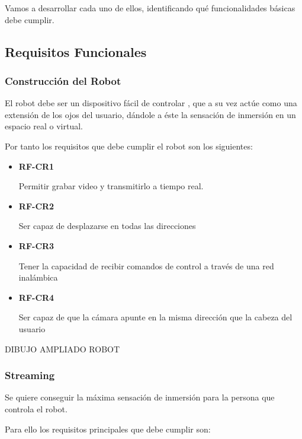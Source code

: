 \documentclass[twoside, 12pt]{epstfg}
\begin{document}
Vamos a desarrollar cada uno de ellos, identificando qué funcionalidades básicas debe cumplir.

\subsection{Requisitos Funcionales}

\subsubsection{Construcción del Robot}


El robot debe ser un dispositivo fácil de controlar , que a su vez actúe como una extensión de los ojos del usuario, dándole a éste la sensación de inmersión en un espacio real o virtual.

Por tanto los requisitos que debe cumplir el robot son los siguientes:


\begin{itemize}
	\item \textbf{RF-CR1}
	
	Permitir grabar video y transmitirlo a tiempo real.
	
	
	\item\textbf{RF-CR2} 
	
	Ser capaz de desplazarse en todas las direcciones
	
	
	\item\textbf{RF-CR3}
	
	Tener la capacidad de recibir comandos de control a través de una red inalámbica
	
	
	\item\textbf{RF-CR4} 
	
	Ser capaz de que la cámara apunte en la misma dirección que la cabeza del usuario
\end{itemize}

DIBUJO AMPLIADO ROBOT

\subsubsection{Streaming}

Se quiere conseguir la máxima sensación de inmersión para la persona que controla el robot.

Para ello los requisitos principales que debe cumplir son:
\end{document}

